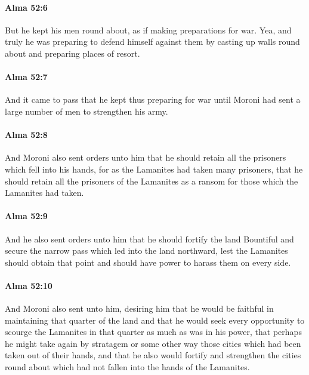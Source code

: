 		\paragraph{Alma 52:6} %
			\label{ALMA-52-6}

			But he kept his men round about,
			as if making preparations for war.
			Yea, and truly he was preparing to defend himself against them
			by casting up walls round about and preparing places of resort.

		\paragraph{Alma 52:7} %
			\label{ALMA-52-7}

			And it came to pass that he kept thus preparing for war
			until Moroni had sent a large number of men to strengthen his army.

		\paragraph{Alma 52:8} %
			\label{ALMA-52-8}

			And Moroni also sent orders unto him
			that he should retain all the prisoners which fell into his hands,
			for as the Lamanites had taken many prisoners,
			that he should retain all the prisoners of the Lamanites
			as a ransom for those which the Lamanites had taken.

		\paragraph{Alma 52:9} %
			\label{ALMA-52-9}

			And he also sent orders unto him that he should fortify the land Bountiful
			and secure the narrow pass which led into the land northward,
			lest the Lamanites should obtain that point
			and should have power to harass them on every side.

		\paragraph{Alma 52:10} %
			\label{ALMA-52-10}

			And Moroni also sent unto him, desiring him
			that he would be faithful in maintaining that quarter of the land
			and that he would seek every opportunity
			to scourge the Lamanites in that quarter as much as was in his power,
			that perhaps he might take again by stratagem or some other way
			those cities which had been taken out of their hands,
			and that he also would fortify and strengthen the cities round about
			which had not fallen into the hands of the Lamanites.

